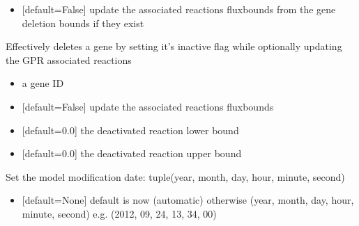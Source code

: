 \documentclass[letterpaper,10pt,english]{sphinxmanual}
\begin{document}
\begin{fulllineitems}
\begin{fulllineitems}
\begin{itemize}
\item {} 
\sphinxAtStartPar
{} {[}default=False{]} update the associated reactions fluxbounds from the gene deletion bounds if they exist

\end{itemize}

\end{fulllineitems}


\begin{fulllineitems}
\label{\detokenize{modules_doc:cbmpy.CBModel.Model.setGeneInactive}}
\pysigstartsignatures
{}
\pysigstopsignatures
\sphinxAtStartPar
Effectively deletes a gene by setting it’s inactive flag while optionally updating the GPR associated reactions
\begin{itemize}
\item {} 
\sphinxAtStartPar
{} a gene ID

\item {} 
\sphinxAtStartPar
{} {[}default=False{]} update the associated reactions fluxbounds

\item {} 
\sphinxAtStartPar
{} {[}default=0.0{]} the deactivated reaction lower bound

\item {} 
\sphinxAtStartPar
{} {[}default=0.0{]} the deactivated reaction upper bound

\end{itemize}

\end{fulllineitems}


\begin{fulllineitems}
\label{\detokenize{modules_doc:cbmpy.CBModel.Model.setModifiedDate}}
\pysigstartsignatures
{}
\pysigstopsignatures
\sphinxAtStartPar
Set the model modification date: tuple(year, month, day, hour, minute, second)
\begin{itemize}
\item {} 
\sphinxAtStartPar
{} {[}default=None{]} default is now (automatic) otherwise (year, month, day, hour, minute, second) e.g. (2012, 09, 24, 13, 34, 00)


\end{itemize}
\end{fulllineitems}
\end{fulllineitems}
\end{document}
